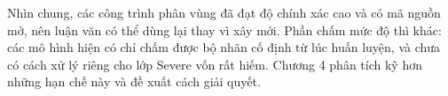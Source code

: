 Nhìn chung, các công trình phân vùng đã đạt độ chính xác cao và có mã nguồn mở, nên luận văn có thể dùng lại thay vì xây mới. Phần chấm mức độ thì khác: các mô hình hiện có chỉ chấm được bộ nhãn cố định từ lúc huấn luyện, và chưa có cách xử lý riêng cho lớp Severe vốn rất hiếm. Chương 4 phân tích kỹ hơn những hạn chế này và đề xuất cách giải quyết.



